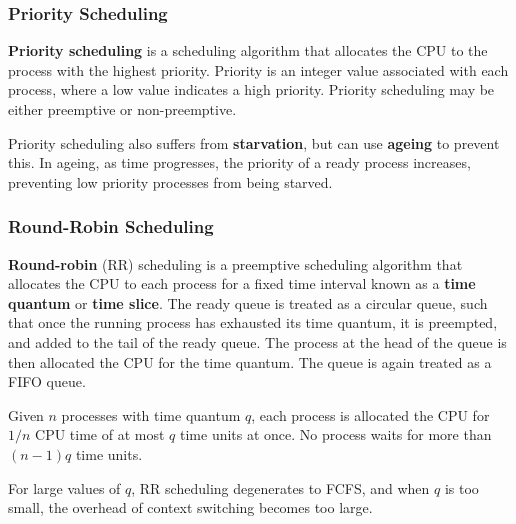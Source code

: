 \documentclass{article}
\begin{document}
\subsubsection{Priority Scheduling}
\textbf{Priority scheduling} is a scheduling algorithm that allocates
the CPU to the process with the highest priority. Priority is an integer
value associated with each process, where a low value indicates a high
priority. Priority scheduling may be either preemptive or non-preemptive.

Priority scheduling also suffers from \textbf{starvation}, but can use
\textbf{ageing} to prevent this. In ageing, as time progresses, the
priority of a ready process increases, preventing low priority
processes from being starved.
\subsubsection{Round-Robin Scheduling}
\textbf{Round-robin} (RR) scheduling is a preemptive scheduling algorithm
that allocates the CPU to each process for a fixed time interval known
as a \textbf{time quantum} or \textbf{time slice}. The ready queue is
treated as a circular queue, such that once the running process has
exhausted its time quantum, it is preempted, and added to the tail of
the ready queue. The process at the head of the queue is then allocated
the CPU for the time quantum. The queue is again treated as a FIFO
queue.

Given \(n\) processes with time quantum \(q\), each process is
allocated the CPU for \(1/n\) CPU time of at most \(q\) time units at
once. No process waits for more than \(\left( n-1 \right) q\) time
units.

For large values of \(q\), RR scheduling degenerates to FCFS, and when
\(q\) is too small, the overhead of context switching becomes too
large.
\end{document}
